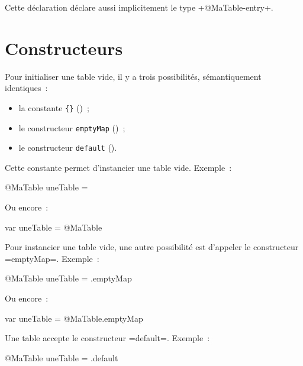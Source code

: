 Cette déclaration déclare aussi implicitement le type \ggs+@MaTable-entry+.





\section{Constructeurs}

Pour initialiser une table vide, il y a trois possibilités, sémantiquement identiques~:
\begin{itemize}
  \item la constante \texttt{\{\}} ()~; 
  \item le constructeur \texttt{emptyMap} ()~; 
  \item le constructeur \texttt{default} (). 
\end{itemize}



Cette constante permet d'instancier une table vide. Exemple~:
\begin{galgas}
@MaTable uneTable = {}
\end{galgas}

Ou encore~:

\begin{galgas}
var uneTable = @MaTable {}
\end{galgas}


Pour instancier une table vide, une autre possibilité est d'appeler le constructeur \ggs=emptyMap=. Exemple~:
\begin{galgas}
@MaTable uneTable = .emptyMap
\end{galgas}

Ou encore~:

\begin{galgas}
var uneTable = @MaTable.emptyMap
\end{galgas}

 



Une table accepte le constructeur \ggs=default=. Exemple~:
\begin{galgas}
@MaTable uneTable = .default
\end{galgas}

